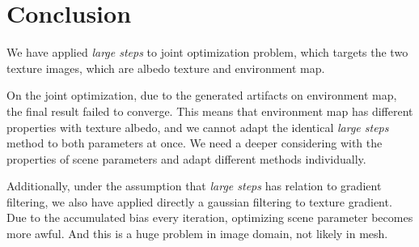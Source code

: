 \section*{Conclusion}\label{ch:ch5label}

We have applied \emph{large steps}\cite{Nicolet2021Large} to joint optimization problem, which targets the two texture images, which are albedo texture and environment map. 

On the joint optimization, due to the generated artifacts on environment map, the final result failed to converge. This means that environment map has different properties with texture albedo, and we cannot adapt the identical \emph{large steps} method to both parameters at once. We need a deeper considering with the properties of scene parameters and adapt different methods individually.

Additionally, under the assumption that \emph{large steps} has relation to gradient filtering, we also have applied directly a gaussian filtering to texture gradient. Due to the accumulated bias every iteration, optimizing scene parameter becomes more awful. And this is a huge problem in image domain, not likely in mesh.
